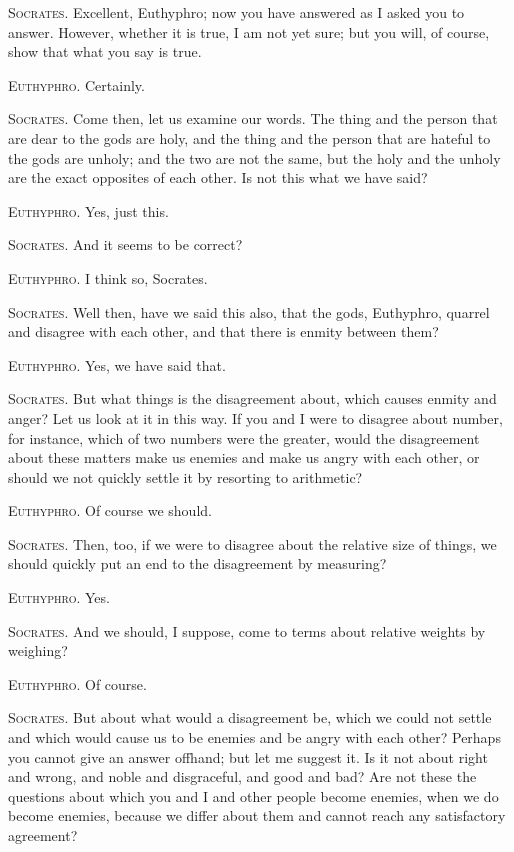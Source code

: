 \textsc{Socrates}. Excellent, Euthyphro; now you have answered as I
asked you to answer. However, whether it is true, I am not yet sure;
but you will, of course, show that what you say is true.

\textsc{Euthyphro}. Certainly.

\textsc{Socrates}. Come then, let us examine our words. The thing and
the person that are dear to the gods are holy, and the thing and the
person that are hateful to the gods are unholy; and the two are not
the same, but the holy and the unholy are the  exact
opposites of each other. Is not this what we have said?

\textsc{Euthyphro}. Yes, just this.

\textsc{Socrates}. And it seems to be correct?

\textsc{Euthyphro}. I think so, Socrates.

\textsc{Socrates}. Well then, have we said this also, that the gods,
Euthyphro, quarrel and disagree with each other, and that there is
enmity between them?

\textsc{Euthyphro}. Yes, we have said that.

\textsc{Socrates}. But what things is the disagreement about, which
causes enmity and anger? Let us look at it in this way. If you and I
were to disagree about number, for instance, which of two numbers were
the greater, would the disagreement about these matters make us
enemies and make us angry with each other, or should we not quickly
settle it by resorting to arithmetic?

\textsc{Euthyphro}. Of course we should.

\textsc{Socrates}. Then, too, if we were to disagree about the
relative size of things, we should quickly put an end to the
disagreement by measuring?

\textsc{Euthyphro}. Yes.

\textsc{Socrates}. And we should, I suppose, come to terms about
relative weights by weighing?

\textsc{Euthyphro}. Of course.

\textsc{Socrates}. But about what would a disagreement be, which we
could not settle and which would cause us to be enemies and be angry
with each other? Perhaps you cannot give an answer offhand; but let
 me suggest it. Is it not about right and wrong, and noble
and disgraceful, and good and bad? Are not these the questions about
which you and I and other people become enemies, when we do become
enemies, because we differ about them and cannot reach any
satisfactory agreement?

